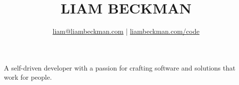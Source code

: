 \title{\textcolor{my-red}{LIAM BECKMAN}}
\author{
    \textcolor{my-blue}{\href{mailto:liam@liambeckman.com}{liam@liambeckman.com}} | \textcolor{my-blue}{\href{https://liambeckman.com/code}{liambeckman.com/code}}
}

\date{\vspace{-2em}}



\maketitle

\begin{center}
A self-driven developer with a passion for crafting software and solutions that work for people.\\
\end{center}

